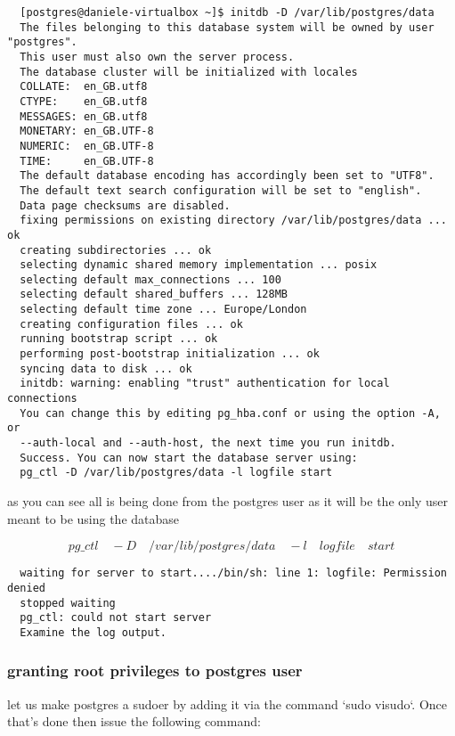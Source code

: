 \documentclass[a4paper,12pt]{article}
\begin{document}
\begin{lstlisting}
  [postgres@daniele-virtualbox ~]$ initdb -D /var/lib/postgres/data  
  The files belonging to this database system will be owned by user "postgres".   
  This user must also own the server process.   
  The database cluster will be initialized with locales   
  COLLATE:  en_GB.utf8  
  CTYPE:    en_GB.utf8  
  MESSAGES: en_GB.utf8  
  MONETARY: en_GB.UTF-8  
  NUMERIC:  en_GB.UTF-8  
  TIME:     en_GB.UTF-8  
  The default database encoding has accordingly been set to "UTF8".  
  The default text search configuration will be set to "english".   
  Data page checksums are disabled.   
  fixing permissions on existing directory /var/lib/postgres/data ... ok   
  creating subdirectories ... ok   
  selecting dynamic shared memory implementation ... posix   
  selecting default max_connections ... 100   
  selecting default shared_buffers ... 128MB   
  selecting default time zone ... Europe/London   
  creating configuration files ... ok   
  running bootstrap script ... ok   
  performing post-bootstrap initialization ... ok   
  syncing data to disk ... ok   
  initdb: warning: enabling "trust" authentication for local connections   
  You can change this by editing pg_hba.conf or using the option -A, or   
  --auth-local and --auth-host, the next time you run initdb.   
  Success. You can now start the database server using:   
  pg_ctl -D /var/lib/postgres/data -l logfile start   
\end{lstlisting}




as you can see all is being done from the postgres user as it will be the only user meant to be using the database

\[ pg\_ctl \quad -D \quad /var/lib/postgres/data \quad -l \quad logfile \quad start \]


\begin{lstlisting}
  waiting for server to start..../bin/sh: line 1: logfile: Permission denied   
  stopped waiting   
  pg_ctl: could not start server   
  Examine the log output.   
\end{lstlisting}

\subsubsection{ granting root privileges to postgres user}

let us make postgres a sudoer by adding it via the command `sudo visudo`. Once that's done then issue the following command:
\end{document}
